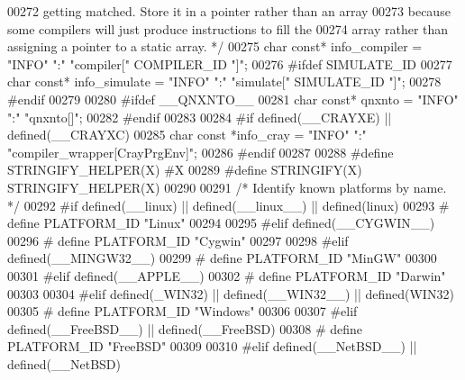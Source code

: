 \begin{DoxyCode}
{{{{{{{{{{{{{{{{{{{{{{{{{{{{{{{{{{{{00272 \textcolor{comment}{   getting matched.  Store it in a pointer rather than an array}
00273 \textcolor{comment}{   because some compilers will just produce instructions to fill the}
00274 \textcolor{comment}{   array rather than assigning a pointer to a static array.  */}
00275 \textcolor{keywordtype}{char} \textcolor{keyword}{const}* info_compiler = \textcolor{stringliteral}{"INFO"} \textcolor{stringliteral}{":"} \textcolor{stringliteral}{"compiler["} COMPILER_ID \textcolor{stringliteral}{"]"};
00276 \textcolor{preprocessor}{#ifdef SIMULATE\_ID}
00277 \textcolor{keywordtype}{char} \textcolor{keyword}{const}* info\_simulate = \textcolor{stringliteral}{"INFO"} \textcolor{stringliteral}{":"} \textcolor{stringliteral}{"simulate["} SIMULATE\_ID \textcolor{stringliteral}{"]"};
00278 \textcolor{preprocessor}{#endif}
00279 
00280 \textcolor{preprocessor}{#ifdef \_\_QNXNTO\_\_}
00281 \textcolor{keywordtype}{char} \textcolor{keyword}{const}* qnxnto = \textcolor{stringliteral}{"INFO"} \textcolor{stringliteral}{":"} \textcolor{stringliteral}{"qnxnto[]"};
00282 \textcolor{preprocessor}{#endif}
00283 
00284 \textcolor{preprocessor}{#if defined(\_\_CRAYXE) || defined(\_\_CRAYXC)}
00285 \textcolor{keywordtype}{char} \textcolor{keyword}{const} *info\_cray = \textcolor{stringliteral}{"INFO"} \textcolor{stringliteral}{":"} \textcolor{stringliteral}{"compiler\_wrapper[CrayPrgEnv]"};
00286 \textcolor{preprocessor}{#endif}
00287 
00288 \textcolor{preprocessor}{#define STRINGIFY\_HELPER(X) #X}
00289 \textcolor{preprocessor}{#define STRINGIFY(X) STRINGIFY\_HELPER(X)}
00290 
00291 \textcolor{comment}{/* Identify known platforms by name.  */}
00292 \textcolor{preprocessor}{#if defined(\_\_linux) || defined(\_\_linux\_\_) || defined(linux)}
00293 \textcolor{preprocessor}{# define PLATFORM\_ID "Linux"}
00294 
00295 \textcolor{preprocessor}{#elif defined(\_\_CYGWIN\_\_)}
00296 \textcolor{preprocessor}{# define PLATFORM\_ID "Cygwin"}
00297 
00298 \textcolor{preprocessor}{#elif defined(\_\_MINGW32\_\_)}
00299 \textcolor{preprocessor}{# define PLATFORM\_ID "MinGW"}
00300 
00301 \textcolor{preprocessor}{#elif defined(\_\_APPLE\_\_)}
00302 \textcolor{preprocessor}{# define PLATFORM\_ID "Darwin"}
00303 
00304 \textcolor{preprocessor}{#elif defined(\_WIN32) || defined(\_\_WIN32\_\_) || defined(WIN32)}
00305 \textcolor{preprocessor}{# define PLATFORM\_ID "Windows"}
00306 
00307 \textcolor{preprocessor}{#elif defined(\_\_FreeBSD\_\_) || defined(\_\_FreeBSD)}
00308 \textcolor{preprocessor}{# define PLATFORM\_ID "FreeBSD"}
00309 
00310 \textcolor{preprocessor}{#elif defined(\_\_NetBSD\_\_) || defined(\_\_NetBSD)}
}}}}}}}}}}}}}}}}}}}}}}}}}}}}}}}}}}}}
\end{DoxyCode}
